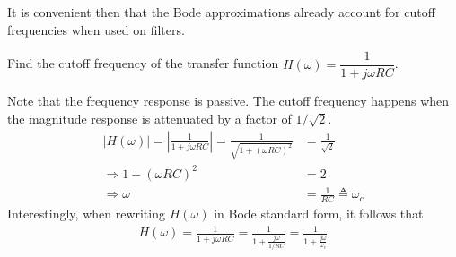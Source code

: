 \documentclass{report}
\begin{document}
\\ \\
It is convenient then that the Bode approximations already account for cutoff frequencies when used on filters.
\begin{example}
    Find the cutoff frequency of the transfer function $H(\omega)=\dfrac{1}{1+j\omega RC}$.
\end{example}
\begin{solution}
    Note that the frequency response is passive. The cutoff frequency happens when the magnitude response is attenuated by a factor of $1/\sqrt{2}$.
    \begin{align*}
        |H(\omega)|=\left|\frac{1}{1+j\omega RC}\right| = \frac{1}{\sqrt{1+(\omega RC)^2}} &= \frac{1}{\sqrt{2}} \\
        \Longrightarrow 1+(\omega RC)^2 &= 2 \\ 
        \Longrightarrow \omega &= \frac{1}{RC} \triangleq \omega_c
    \end{align*}
    Interestingly, when rewriting $H(\omega)$ in Bode standard form, it follows that 
    \begin{align*}
        H(\omega) = \frac{1}{1+j\omega RC} = \frac{1}{1+\frac{j\omega}{1/RC}} = \frac{1}{1+\frac{j\omega}{\omega_c}}
    \end{align*}
\end{solution}
\end{document}

